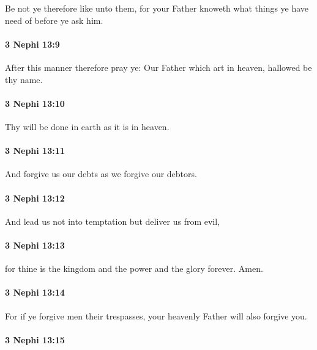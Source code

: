 			Be not ye therefore like unto them,
			for your Father knoweth what things ye have need of before ye ask him.

		\paragraph{3 Nephi 13:9} %
			\label{3NEPHI-13-9}

			After this manner therefore pray ye:
			Our Father which art in heaven,
			hallowed be thy name.

		\paragraph{3 Nephi 13:10} %
			\label{3NEPHI-13-10}

			Thy will be done in earth as it is in heaven.

		\paragraph{3 Nephi 13:11} %
			\label{3NEPHI-13-11}

			And forgive us our debts as we forgive our debtors.

		\paragraph{3 Nephi 13:12} %
			\label{3NEPHI-13-12}

			And lead us not into temptation but deliver us from evil,

		\paragraph{3 Nephi 13:13} %
			\label{3NEPHI-13-13}

			for thine is the kingdom and the power and the glory forever.
			Amen.

		\paragraph{3 Nephi 13:14} %
			\label{3NEPHI-13-14}

			For if ye forgive men their trespasses,
			your heavenly Father will also forgive you.

		\paragraph{3 Nephi 13:15} %
			\label{3NEPHI-13-15}

